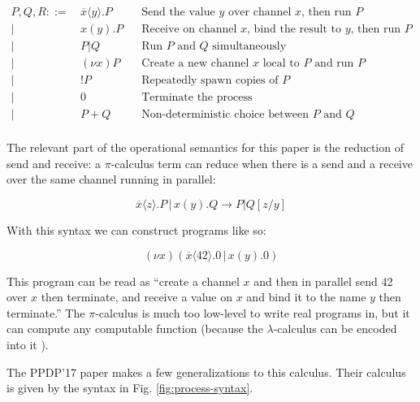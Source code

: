 \documentclass[runningheads,plain]{llncs}
\begin{document}
\begin{align*}
P, Q, R ::= \, & \overline{x} \langle y \rangle.P \,\,\, \, \, &\text{Send the value }y\text{ over channel }x\text{, then run }P \\
|\,\,\, & x(y).P \,\,\, \, \, & \text{Receive on channel }x\text{, bind the result to }y\text{, then run }P \\
|\,\,\, & P|Q \,\,\, \, \, \, \, \, \, &\text{Run }P\text{ and }Q\text{ simultaneously} \\
|\,\,\, & (\nu x)P  \,\,\, &\text{Create a new channel }x\text{ local to } P \text{ and run }P \\
|\,\,\, & !P \,\,\, &\text{Repeatedly spawn copies of }P \\
|\,\,\, & 0 & \text{Terminate the process} \\
|\,\,\, & P+Q \,\,\, \, \, \, \, \, \, &\text{Non-deterministic choice between }P\text{ and }Q\\
\end{align*}

The relevant part of the operational semantics for this paper is the
reduction of send and receive: a \(\pi\)-calculus term can reduce when
there is a send and a receive over the same channel running in parallel:

\[\overline{x}\langle z \rangle.P\, |\, x(y).Q \rightarrow P | Q[z/y]\]

With this syntax we can construct programs like so:

\[(\nu x)(\overline{x}\langle 42 \rangle.0\, |\, x(y).0)\]

This program can be read as ``create a channel \(x\) and then in
parallel send 42 over \(x\) then terminate, and receive a value on \(x\)
and bind it to the name \(y\) then terminate.'' The \(\pi\)-calculus is
much too low-level to write real programs in, but it can compute any
computable function (because the \(\lambda\)-calculus can be encoded
into it \cite{milner1992functions}).

The PPDP'17 paper makes a few generalizations to this calculus. Their
calculus is given by the syntax in Fig. \ref{fig:process-syntax}.
\end{document}
